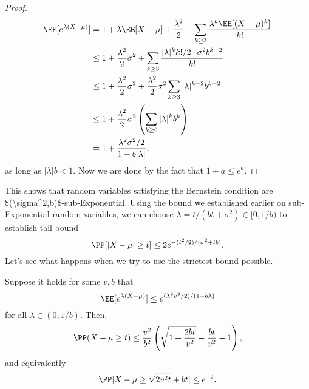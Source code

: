 \begin{proof}
\begin{align*}
	\EE[e^{\lambda(X-\mu)}] &= 1 + \lambda \EE[X-\mu] + \frac{\lambda^2}{2} + \sum_{k\geq 3}\frac{\lambda^k \EE[(X-\mu)^k]}{k!} \\
													&\leq 1 + \frac{\lambda^2}{2}\sigma^2 + \sum_{k\geq 3} \frac{\vert \lambda\vert^k k!/2\cdot \sigma^2 b^{k-2}}{k!} \\
													&\leq 1 + \frac{\lambda^2}{2}\sigma^2 + \frac{\lambda^2}{2}\sigma^2 \sum_{k\geq 3} \vert \lambda\vert^{k-2}b^{k-2} \\
													&\leq 1 + \frac{\lambda^2}{2}\sigma^2\left(\sum_{k\geq 0}\vert \lambda\vert^k b^k\right) \\
													&= 1 + \frac{\lambda^2\sigma^2/2}{1 - b\vert \lambda\vert},
\end{align*}
as long as $\vert \lambda\vert b < 1$. Now we are done by the fact that $1 + a\leq e^a$.  
\end{proof}

This shows that \ac{random variables satisfying the Bernstein condition are $(\sigma^2,b)$-sub-Exponential}. Using the bound we established earlier on sub-Exponential random variables, we can choose $\lambda = t/(bt+\sigma^2)\in [0,1/b)$ to establish tail bound
\[\PP[\vert X-\mu\vert \geq t]\leq 2e^{-(t^2/2) / (\sigma^2 + tb)}.\] 
Let's see what happens when we try to use the strictest bound possible.
\begin{theorem}
\thmlabel

Suppose it holds for some $v,b$ that 
\[\EE[e^{\lambda(X-\mu)}]\leq e^{(\lambda^2v^2/2)/(1-b\lambda)}\] 
for all $\lambda\in (0,1/b)$. Then, 
\[\PP(X-\mu \geq t) \leq \frac{v^2}{b^2}\left(\sqrt{1 + \frac{2bt}{v^2}} - \frac{bt}{v^2} - 1\right),\] 
and equivalently
\[\PP[X-\mu\geq \sqrt{2v^2t}+bt]\leq e^{-t}.\] 
\end{theorem}

